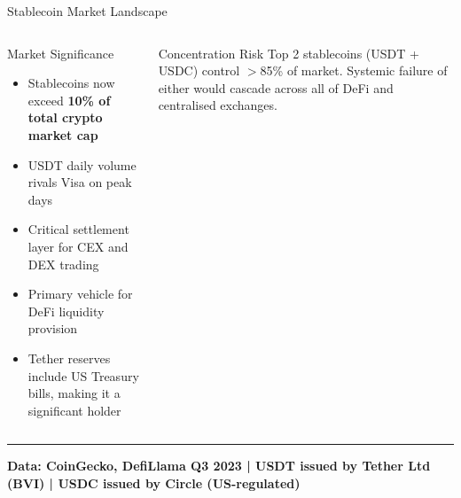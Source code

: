 \documentclass[8pt,aspectratio=169]{beamer}
\newcommand{\bottomnote}[1]{\vfill\vspace{-2mm}\textcolor{mllavender2}{\rule{\textwidth}{0.4pt}}\vspace{1mm}\footnotesize\textbf{#1}}
\begin{document}
\begin{frame}{Stablecoin Market Landscape}
\begin{columns}[T]
\begin{block}{Market Significance}
\begin{itemize}\setlength{\itemsep}{2pt}
  \item Stablecoins now exceed \textbf{10\% of total crypto market cap}
  \item USDT daily volume rivals Visa on peak days
  \item Critical settlement layer for CEX and DEX trading
  \item Primary vehicle for DeFi liquidity provision
  \item Tether reserves include US Treasury bills, making it a significant holder
\end{itemize}
\end{block}
\vspace{2mm}
\begin{alertblock}{Concentration Risk}
\scriptsize Top 2 stablecoins (USDT + USDC) control $>$85\% of market. Systemic failure of either would cascade across all of DeFi and centralised exchanges.
\end{alertblock}
\end{columns}
\bottomnote{Data: CoinGecko, DefiLlama Q3 2023 | USDT issued by Tether Ltd (BVI) | USDC issued by Circle (US-regulated)}
\end{frame}
\end{document}
